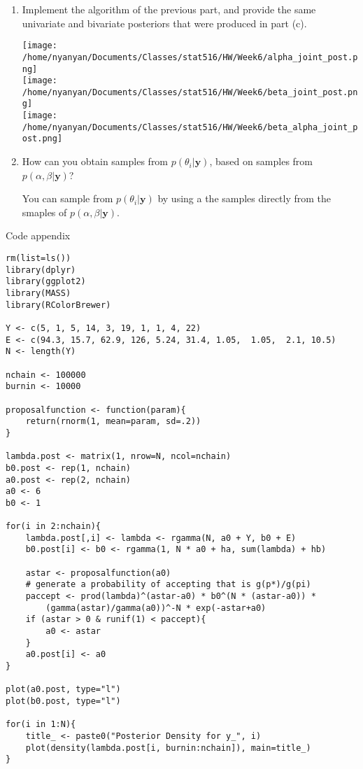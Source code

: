 \documentclass{article} %
\begin{document}
\begin{enumerate}
\begin{enumerate}
\item Implement the algorithm of the previous part, and provide the
  same univariate and bivariate posteriors that were produced in part (c).

  \texttt{[image: /home/nyanyan/Documents/Classes/stat516/HW/Week6/alpha\_joint\_post.png]} \\
  \texttt{[image: /home/nyanyan/Documents/Classes/stat516/HW/Week6/beta\_joint\_post.png]} \\
  \texttt{[image: /home/nyanyan/Documents/Classes/stat516/HW/Week6/beta\_alpha\_joint\_post.png]} \\

\item How can you obtain samples from $p(\theta_i|\mathbf{y})$, based on samples from $p(\alpha,\beta|\mathbf{y})$?

  You can sample from $p(\theta_i|\mathbf{y})$ by using a the samples directly from
  the smaples of $p(\alpha,\beta|\mathbf{y})$.
\end{enumerate}

Code appendix

\begin{lstlisting}
rm(list=ls())
library(dplyr)
library(ggplot2)
library(MASS)
library(RColorBrewer)

Y <- c(5, 1, 5, 14, 3, 19, 1, 1, 4, 22)
E <- c(94.3, 15.7, 62.9, 126, 5.24, 31.4, 1.05,  1.05,  2.1, 10.5)
N <- length(Y)

nchain <- 100000
burnin <- 10000

proposalfunction <- function(param){
    return(rnorm(1, mean=param, sd=.2))
}

lambda.post <- matrix(1, nrow=N, ncol=nchain)
b0.post <- rep(1, nchain)
a0.post <- rep(2, nchain)
a0 <- 6
b0 <- 1

for(i in 2:nchain){
    lambda.post[,i] <- lambda <- rgamma(N, a0 + Y, b0 + E)
    b0.post[i] <- b0 <- rgamma(1, N * a0 + ha, sum(lambda) + hb)

    astar <- proposalfunction(a0)
    # generate a probability of accepting that is g(p*)/g(pi)
    paccept <- prod(lambda)^(astar-a0) * b0^(N * (astar-a0)) *
        (gamma(astar)/gamma(a0))^-N * exp(-astar+a0)
    if (astar > 0 & runif(1) < paccept){
        a0 <- astar
    }
    a0.post[i] <- a0
}

plot(a0.post, type="l")
plot(b0.post, type="l")

for(i in 1:N){
    title_ <- paste0("Posterior Density for y_", i)
    plot(density(lambda.post[i, burnin:nchain]), main=title_)
}


\end{lstlisting}
\end{enumerate}
\end{document}
